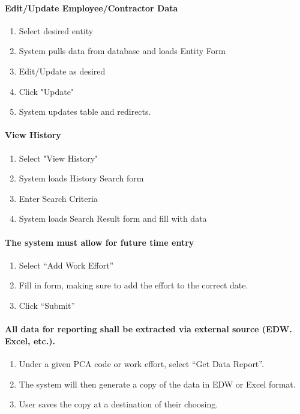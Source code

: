 \documentclass[letterpaper]{article}
\begin{document}
\paragraph{Edit/Update Employee/Contractor Data}
\begin{enumerate}
\item Select desired entity
\item System pulls data from database and loads Entity Form
\item Edit/Update as desired
\item Click "Update"
\item System updates table and redirects.
\end{enumerate}

\paragraph{View History}
\begin{enumerate}
\item Select "View History"
\item System loads History Search form
\item Enter Search Criteria
\item System loads Search Result form and fill with data
\end{enumerate}

\paragraph{The system must allow for future time entry}
\begin{enumerate}
\item Select ``Add Work Effort''
\item Fill in form, making sure to add the effort to the correct date.
\item Click ``Submit''
\end{enumerate}

\paragraph{All data for reporting shall be extracted via external source (EDW. Excel, etc.).}
\begin{enumerate}
\item Under a given PCA code or work effort, select ``Get Data Report''.
\item The system will then generate a copy of the data in EDW or Excel format.
\item User saves the copy at a destination of their choosing.
\end{enumerate}
\end{document}
